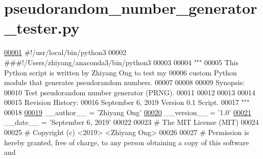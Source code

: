 \hypertarget{pseudorandom__number__generator__tester_8py_source}{}\section{pseudorandom\+\_\+number\+\_\+generator\+\_\+tester.\+py}
\label{pseudorandom__number__generator__tester_8py_source}

\begin{DoxyCode}
\hypertarget{pseudorandom__number__generator__tester_8py_source_l00001}{}\hyperlink{namespacerandom__process__models_1_1pseudorandom__number__generator__tester}{00001} \textcolor{comment}{#!/usr/local/bin/python3}
00002 \textcolor{comment}{###!/Users/zhiyang/anaconda3/bin/python3}
00003 
00004 \textcolor{stringliteral}{"""}
00005 \textcolor{stringliteral}{    This Python script is written by Zhiyang Ong to test my}
00006 \textcolor{stringliteral}{        custom Python module that generates pseudorandom numbers.}
00007 \textcolor{stringliteral}{}
00008 \textcolor{stringliteral}{}
00009 \textcolor{stringliteral}{    Synopsis:}
00010 \textcolor{stringliteral}{    Test pseudorandom number generator (PRNG).}
00011 \textcolor{stringliteral}{}
00012 \textcolor{stringliteral}{}
00013 \textcolor{stringliteral}{}
00014 \textcolor{stringliteral}{}
00015 \textcolor{stringliteral}{    Revision History:}
00016 \textcolor{stringliteral}{    September 6, 2019           Version 0.1 Script.}
00017 \textcolor{stringliteral}{"""}
00018 
\hypertarget{pseudorandom__number__generator__tester_8py_source_l00019}{}\hyperlink{namespacerandom__process__models_1_1pseudorandom__number__generator__tester_a67279ea57e007a95e27af9f25cf84db6}{00019} \_\_author\_\_ = \textcolor{stringliteral}{'Zhiyang Ong'}
\hypertarget{pseudorandom__number__generator__tester_8py_source_l00020}{}\hyperlink{namespacerandom__process__models_1_1pseudorandom__number__generator__tester_abdadf15e475ca77a4ef2bebd886b8dcc}{00020} \_\_version\_\_ = \textcolor{stringliteral}{'1.0'}
\hypertarget{pseudorandom__number__generator__tester_8py_source_l00021}{}\hyperlink{namespacerandom__process__models_1_1pseudorandom__number__generator__tester_a8dbe9b20b965a3a680bcad127e27c55e}{00021} \_\_date\_\_ = \textcolor{stringliteral}{'September 6, 2019'}
00022 
00023 \textcolor{comment}{#   The MIT License (MIT)}
00024 
00025 \textcolor{comment}{#   Copyright (c) <2019> <Zhiyang Ong>}
00026 
00027 \textcolor{comment}{#   Permission is hereby granted, free of charge, to any person obtaining a copy of this software and
}
\end{DoxyCode}

